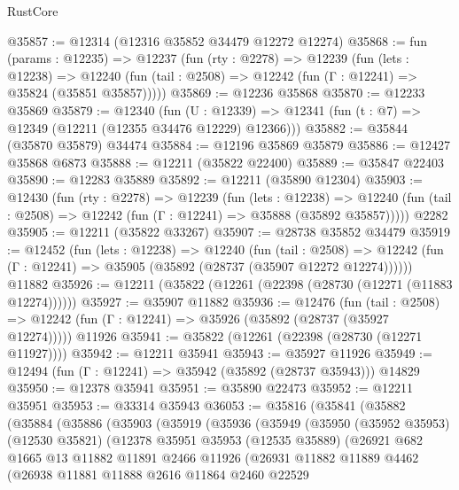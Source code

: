 \begin{lexlean}{RustCore}
\begin{coremodule}
@35857 := @12314 (@12316 @35852 @34479 @12272 @12274)
@35868 := fun (params : @12235) =>
  @12237
    (fun (rty : @2278) =>
    @12239
      (fun (lets : @12238) =>
      @12240 (fun (tail : @2508) => @12242 (fun (Γ : @12241) => @35824 (@35851 @35857)))))
@35869 := @12236 @35868
@35870 := @12233 @35869
@35879 := @12340
    (fun (U : @12339) => @12341 (fun (t : @7) => @12349 (@12211 (@12355 @34476 @12229) @12366)))
@35882 := @35844 (@35870 @35879) @34474
@35884 := @12196 @35869 @35879
@35886 := @12427 @35868 @6873
@35888 := @12211 (@35822 @22400)
@35889 := @35847 @22403
@35890 := @12283 @35889
@35892 := @12211 (@35890 @12304)
@35903 := @12430
    (fun (rty : @2278) =>
    @12239
      (fun (lets : @12238) =>
      @12240 (fun (tail : @2508) => @12242 (fun (Γ : @12241) => @35888 (@35892 @35857)))))
    @2282
@35905 := @12211 (@35822 @33267)
@35907 := @28738 @35852 @34479
@35919 := @12452
    (fun (lets : @12238) =>
    @12240
      (fun (tail : @2508) =>
      @12242 (fun (Γ : @12241) => @35905 (@35892 (@28737 (@35907 @12272 @12274))))))
    @11882
@35926 := @12211 (@35822 (@12261 (@22398 (@28730 (@12271 (@11883 @12274))))))
@35927 := @35907 @11882
@35936 := @12476
    (fun (tail : @2508) => @12242 (fun (Γ : @12241) => @35926 (@35892 (@28737 (@35927 @12274)))))
    @11926
@35941 := @35822 (@12261 (@22398 (@28730 (@12271 @11927))))
@35942 := @12211 @35941
@35943 := @35927 @11926
@35949 := @12494 (fun (Γ : @12241) => @35942 (@35892 (@28737 @35943))) @14829
@35950 := @12378 @35941
@35951 := @35890 @22473
@35952 := @12211 @35951
@35953 := @33314 @35943
@36053 := @35816
    (@35841
      (@35882
        (@35884
          (@35886
            (@35903
              (@35919
                (@35936
                  (@35949
                    (@35950
                      (@35952 @35953)
                      (@12530 @35821)
                      (@12378
                        @35951
                        @35953
                        (@12535 @35889)
                        (@26921
                          @682
                          @1665
                          @13
                          @11882
                          @11891
                          @2466
                          @11926
                          (@26931
                            @11882
                            @11889
                            @4462
                            (@26938
                              @11881
                              @11888
                              @2616
                              @11864
                              @2460
                              @22529

\end{coremodule}
\end{lexlean}
